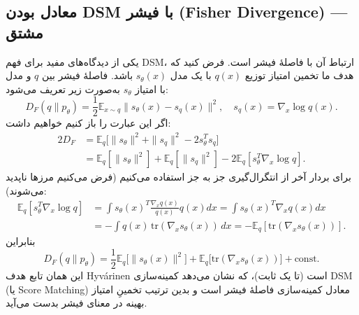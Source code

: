 \subsection{معادل بودن DSM با فیشر (Fisher Divergence) — مشتق}
یکی از دیدگاه‌های مفید برای فهم DSM، ارتباط آن با فاصلهٔ فیشر است. فرض کنید که هدف ما تخمین امتیاز توزیع \(q(x)\) با یک مدل \(s_{\theta}(x)\) باشد. فاصلهٔ فیشر بین \(q\) و مدل با امتیاز \(s_{\theta}\) به‌صورت زیر تعریف می‌شود:
\begin{equation}
D_F(q\|p_{\theta}) = \frac{1}{2} \mathbb{E}_{x\sim q} \big\| s_{\theta}(x) - s_q(x) \big\|^2, \quad s_q(x)=\nabla_x \log q(x).
\end{equation}
اگر این عبارت را باز کنیم خواهیم داشت:
\begin{align}
2 D_F &= \mathbb{E}_q \big[ \|s_{\theta}\|^2 + \|s_q\|^2 - 2 s_{\theta}^T s_q \big] \\
&= \mathbb{E}_q[\|s_{\theta}\|^2] + \mathbb{E}_q[\|s_q\|^2] - 2 \mathbb{E}_q[s_{\theta}^T \nabla_x \log q].
\end{align}
برای بردار آخر از انتگرال‌گیری جز به جز استفاده می‌کنیم (فرض می‌کنیم مرزها ناپدید می‌شوند):
\begin{align}
\mathbb{E}_q[s_{\theta}^T \nabla_x \log q] &= \int s_{\theta}(x)^T \frac{\nabla_x q(x)}{q(x)} q(x) dx = \int s_{\theta}(x)^T \nabla_x q(x) dx \\
&= -\int q(x) \,\mathrm{tr}(\nabla_x s_{\theta}(x)) \,dx = -\mathbb{E}_q[\mathrm{tr}(\nabla_x s_{\theta}(x))].
\end{align}
بنابراین
\begin{equation}
D_F(q\|p_{\theta}) = \frac{1}{2} \mathbb{E}_q\big[ \|s_{\theta}(x)\|^2 \big] + \mathbb{E}_q\big[\mathrm{tr}(\nabla_x s_{\theta}(x))\big] + \text{const.}
\end{equation}
این همان تابع هدف Hyv\'arinen است (تا یک ثابت)، که نشان می‌دهد کمینه‌سازی DSM (یا Score Matching) معادل کمینه‌سازی فاصلهٔ فیشر است و بدین ترتیب تخمینِ امتیاز بهینه در معنای فیشر بدست می‌آید.

